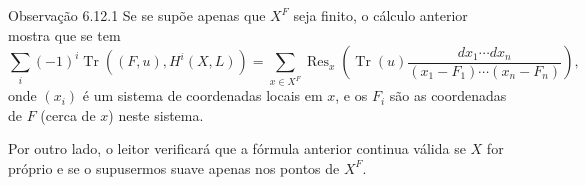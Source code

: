 \begin{statement}{Observação 6.12.1}
Se se supõe apenas que $X^F$ seja finito, o cálculo anterior mostra que se tem
\[
\sum_i(-1)^i\operatorname{Tr}((F,u),H^i(X,L))=
\sum_{x\in X^F}\operatorname{Res}_x\left(\operatorname{Tr}(u)\frac{dx_1\cdots dx_n}{(x_1-F_1)\cdots(x_n-F_n)}\right),
\]
onde $(x_i)$ é um sistema de coordenadas locais em $x$, e os $F_i$ são as coordenadas de $F$ (cerca de $x$) neste sistema.

Por outro lado, o leitor verificará que a fórmula anterior continua válida se $X$ for próprio e se o supusermos suave apenas nos pontos de $X^F$.
\end{statement}
 
